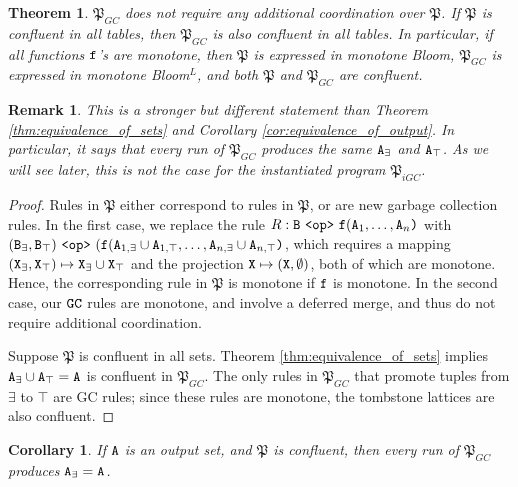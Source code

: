 \documentclass{article}
\numberwithin{equation}{section}
\newtheorem{thm}[theorem]{Theorem}
\newtheorem{cor}[theorem]{Corollary}
\newtheorem{rmk}{Remark}[section]
\renewcommand{\tt}[1]{\ifmmode\text{\texttt{#1}}\else\texttt{#1}\fi}
\begin{document}
\begin{thm}
\label{thm:coord-free}
$\mathfrak{P}_{GC}$ does not require any additional coordination over $\mathfrak{P}$.
If $\mathfrak{P}$ is confluent in all tables, then $\mathfrak{P}_{GC}$ is also confluent in all tables.
In particular, if all functions $\tt{f}$'s are monotone, then $\mathfrak{P}$ is expressed in monotone Bloom, $\mathfrak{P}_{GC}$ is expressed in monotone Bloom$^L$, and both $\mathfrak{P}$ and $\mathfrak{P}_{GC}$ are confluent.
\end{thm}
\begin{rmk}
This is a stronger but different statement than Theorem \ref{thm:equivalence_of_sets} and Corollary \ref{cor:equivalence_of_output}.
In particular, it says that every run of $\mathfrak{P}_{GC}$ produces the same $\tt{A}_\exists$ and $\tt{A}_\top$.
As we will see later, this is not the case for the instantiated program $\mathfrak{P}_{iGC}$.
\end{rmk}
\begin{proof}
Rules in $\mathfrak{P}$ either correspond to rules in $\mathfrak{P}$, or are new garbage collection rules.
In the first case, we replace the rule $R: \tt{B} ~\tt{<op>}~ \tt{f}(\tt{A}_1,\dots,\tt{A}_n\tt{)}$ with $(\tt{B}_\exists, \tt{B}_\top) ~\tt{<op>}~ (\tt{f}(\tt{A}_{1,\exists} \cup \tt{A}_{1,\top}, \dots, \tt{A}_{n,\exists} \cup \tt{A}_{n,\top} \tt{)}$, which requires a mapping $(\tt{X}_\exists, \tt{X}_\top) \mapsto \tt{X}_\exists \cup \tt{X}_\top$ and the projection $\tt{X} \mapsto (\tt{X}, \emptyset)$, both of which are monotone.
Hence, the corresponding rule in $\mathfrak{P}$ is monotone if $\tt{f}$ is monotone.
In the second case, our $\tt{GC}$ rules are monotone, and involve a deferred merge, and thus do not require additional coordination.

Suppose $\mathfrak{P}$ is confluent in all sets.
Theorem \ref{thm:equivalence_of_sets} implies $\tt{A}_{\exists} \cup \tt{A}_\top = \tt{A}$ is confluent in $\mathfrak{P}_{GC}$.
The only rules in $\mathfrak{P}_{GC}$ that promote tuples from $\exists$ to $\top$ are GC rules; since these rules are monotone, the tombstone lattices are also confluent.
\end{proof}

\begin{cor}
\label{cor:confluence_of_output}
If $\tt{A}$ is an output set, and $\mathfrak{P}$ is confluent, then every run of $\mathfrak{P}_{GC}$ produces $\tt{A}_\exists = \tt{A}$.
\end{cor}

\end{document}
